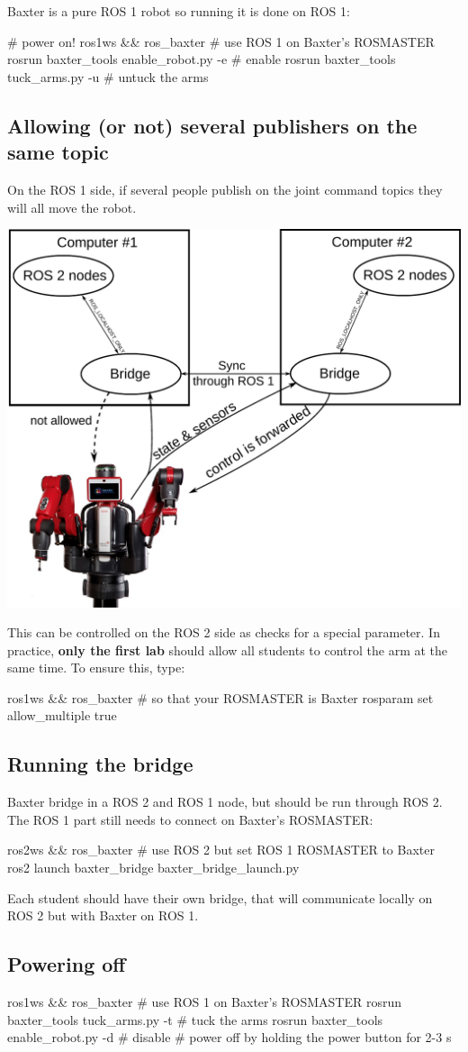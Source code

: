 \documentclass{ecnreport}
\begin{document}
Baxter is a pure ROS 1 robot so running it is done on ROS 1:
\begin{bashcodelarge}
 # power on!
 ros1ws && ros_baxter # use ROS 1 on Baxter's ROSMASTER
 rosrun baxter_tools enable_robot.py -e  # enable
 rosrun baxter_tools tuck_arms.py -u # untuck the arms
\end{bashcodelarge}

\subsection{Allowing (or not) several publishers on the same topic}

On the ROS 1 side, if several people publish on the joint command topics they will all move the robot.

\begin{center}
 \includegraphics[width=.5\linewidth]{sync}
\end{center}


This can be controlled on the ROS 2 side as  checks for a special parameter. In practice, {\bf only the first lab} should allow all students to control the arm at the same time. To ensure this, type:
 \begin{bashcodelarge}
 ros1ws && ros_baxter # so that your ROSMASTER is Baxter
 rosparam set allow_multiple true
\end{bashcodelarge}

\subsection{Running the bridge}

Baxter bridge in a ROS 2 and ROS 1 node, but should be run through ROS 2. The ROS 1 part still needs to connect on Baxter's ROSMASTER:
 \begin{bashcodelarge}
 ros2ws && ros_baxter # use ROS 2 but set ROS 1 ROSMASTER to Baxter
 ros2 launch baxter_bridge baxter_bridge_launch.py
\end{bashcodelarge}

Each student should have their own bridge, that will communicate locally on ROS 2 but with Baxter on ROS 1.

\subsection{Powering off}

\begin{bashcodelarge}
 ros1ws && ros_baxter # use ROS 1 on Baxter's ROSMASTER
 rosrun baxter_tools tuck_arms.py -t # tuck the arms
 rosrun baxter_tools enable_robot.py -d  # disable
 # power off by holding the power button for 2-3 s
\end{bashcodelarge}
\end{document}
